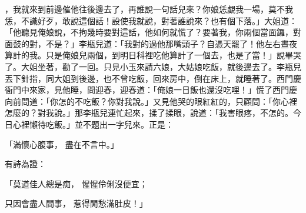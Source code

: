 ，我就來到前邊催他往後邊去了，再誰說一句話兒來？你娘恁覷我一場，莫不我恁，不識好歹，敢說這個話！設使我就說，對著誰說來？也有個下落。」大姐道：「他聽見俺娘說，不拘幾時要對這話，他如何就慌了？要著我，你兩個當面鑼，對面鼓的對，不是？」李瓶兒道：「我對的過他那嘴頭子？自憑天罷了！他左右晝夜算計的我。只是俺娘兒兩個，到明日科裡吃他算計了一個去，也是了當！」說畢哭了。大姐坐著，勸了一回。只見小玉來請六娘，大姑娘吃飯，就後邊去了。李瓶兒丟下針指，同大姐到後邊，也不曾吃飯，回來房中，倒在床上，就睡著了。西門慶衙門中來家，見他睡，問迎春，迎春道：「俺娘一日飯也還沒吃哩！」慌了西門慶向前問道：「你怎的不吃飯？你對我說。」又見他哭的眼紅紅的，只顧問：「你心裡怎麼的？對我說。」那李瓶兒連忙起來，揉了揉眼，說道：「我害眼疼，不怎的。今日心裡懶待吃飯。」並不題出一字兒來。正是：

「滿懷心腹事，  盡在不言中。」

有詩為證：

「莫道佳人總是痴，  惺惺伶俐沒便宜；

只因會盡人間事，  惹得閒愁滿肚皮！」

